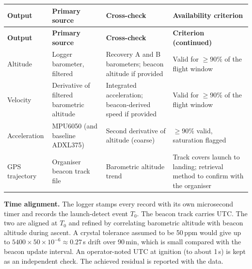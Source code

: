 \small
\begingroup
{}
\begin{longtable}{@{}L{24mm}L{40mm}L{42mm}L{40mm}@{}}
\toprule{}\textbf{Output}&\textbf{Primary source}&\textbf{Cross-check}&\textbf{Availability criterion}\\\midrule\endfirsthead
\toprule{}\textbf{Output}&\textbf{Primary source}&\textbf{Cross-check}&\textbf{Criterion (continued)}\\\midrule\endhead
\bottomrule\endlastfoot
Altitude & Logger barometer, filtered & Recovery A and B barometers; beacon altitude if provided & Valid for $\ge90\%$ of the flight window\\
Velocity & Derivative of filtered barometric altitude & Integrated acceleration; beacon-derived speed if provided & Valid for $\ge90\%$ of the flight window\\
Acceleration & MPU6050 (and baseline ADXL375) & Second derivative of altitude (coarse) & $\ge90\%$ valid, saturation flagged\\
GPS trajectory & Organiser beacon track file & Barometric altitude trend & Track covers launch to landing; retrieval method to confirm with the organiser\\
\end{longtable}
\endgroup %
\normalsize

\textbf{Time alignment.} The logger stamps every record with its own microsecond timer and records the launch-detect event $T_0$. The beacon track carries UTC. The two are aligned at $T_0$ and refined by correlating barometric altitude with beacon altitude during ascent. A crystal tolerance assumed to be 50\,ppm would give up to $5400\times50\times10^{-6}\approx0.27$\,s drift over 90\,min, which is small compared with the beacon update interval. An operator-noted UTC at ignition (to about 1\,s) is kept as an independent check. The achieved residual is reported with the data.

